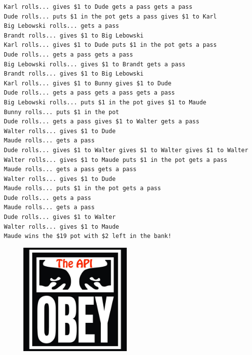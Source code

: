 \documentclass{article}
\begin{document}
\begin{verbatim}
Karl rolls... gives $1 to Dude gets a pass gets a pass 
Dude rolls... puts $1 in the pot gets a pass gives $1 to Karl 
Big Lebowski rolls... gets a pass 
Brandt rolls... gives $1 to Big Lebowski 
Karl rolls... gives $1 to Dude puts $1 in the pot gets a pass 
Dude rolls... gets a pass gets a pass 
Big Lebowski rolls... gives $1 to Brandt gets a pass 
Brandt rolls... gives $1 to Big Lebowski 
Karl rolls... gives $1 to Bunny gives $1 to Dude 
Dude rolls... gets a pass gets a pass gets a pass 
Big Lebowski rolls... puts $1 in the pot gives $1 to Maude 
Bunny rolls... puts $1 in the pot 
Dude rolls... gets a pass gives $1 to Walter gets a pass 
Walter rolls... gives $1 to Dude 
Maude rolls... gets a pass 
Dude rolls... gives $1 to Walter gives $1 to Walter gives $1 to Walter 
Walter rolls... gives $1 to Maude puts $1 in the pot gets a pass 
Maude rolls... gets a pass gets a pass 
Walter rolls... gives $1 to Dude 
Maude rolls... puts $1 in the pot gets a pass 
Dude rolls... gets a pass 
Maude rolls... gets a pass 
Dude rolls... gives $1 to Walter 
Walter rolls... gives $1 to Maude 
Maude wins the $19 pot with $2 left in the bank!
\end{verbatim}

\begin{figure}[ht]
  \centering
    \includegraphics[width=0.5\textwidth]{obey.jpg}
\end{figure}
\end{document}
